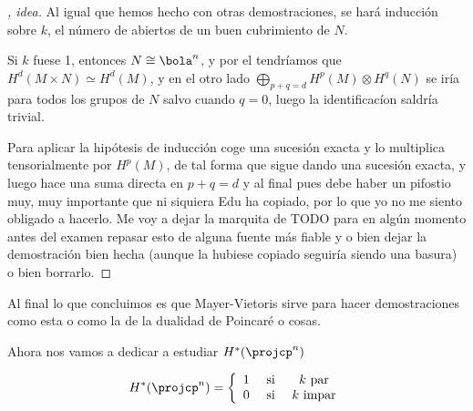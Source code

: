 \documentclass[palatino, bibnumbers]{apuntes}
\begin{document}
\begin{proof}[, idea] Al igual que hemos hecho con otras demostraciones, se hará inducción sobre $k$, el número de abiertos de un buen cubrimiento de $N$.

Si $k$ fuese 1, entonces $N \cong \bola^n$, y por el  tendríamos que $H^d(M × N) \simeq H^d(M)$, y en el otro lado $\bigoplus_{p+ q = d} H^p(M) \otimes H^q(N)$ se iría para todos los grupos de $N$ salvo cuando $q = 0$, luego la identificacíon saldría trivial.

Para aplicar la hipótesis de inducción coge una sucesión exacta y lo multiplica tensorialmente por $H^p(M)$, de tal forma que sigue dando una sucesión exacta, y luego hace una suma directa en $p+q=d$ y al final pues debe haber un pifostio muy, muy importante que ni siquiera Edu ha copiado, por lo que yo no me siento obligado a hacerlo. Me voy a dejar la marquita de TODO para en algún momento antes del examen repasar esto de alguna fuente más fiable y o bien dejar la demostración bien hecha (aunque la hubiese copiado seguiría siendo una basura) o bien borrarlo.
\end{proof}

Al final lo que concluimos es que Mayer-Vietoris sirve para hacer demostraciones como esta o como la de la dualidad de Poincaré o cosas.


Ahora nos vamos a dedicar a estudiar $H^\ast(\projcp^n)$

\begin{theorem}
\[
	H^\ast(\projcp^n) =
		\left\{
			\begin{array}{ccc}
				1 & \text{ si } & k \text{ par}\\
				0 & \text{ si } & k \text{ impar}\\
			\end{array}
		\right.
\]
\end{theorem}
\end{document}
